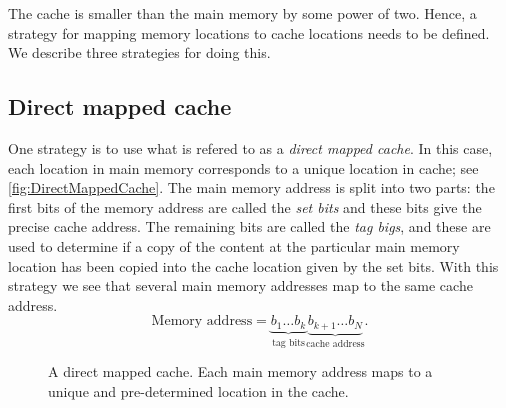 The cache is smaller than the main memory by some power of two. Hence, a
strategy for mapping memory locations to cache locations needs to be defined. We
describe three strategies for doing this.

\subsection{Direct mapped cache}

One strategy is to use what is refered to as a \emph{direct mapped cache}. In
this case, each location in main memory corresponds to a unique location in
cache; see \autoref{fig:DirectMappedCache}. The main memory address is split
into two parts: the first bits of the memory address are called the \emph{set
bits} and these bits give the precise cache address. The remaining bits are
called the \emph{tag bigs}, and these are used to determine if a copy of the
content at the particular main memory location has been copied into the cache
location given by the set bits. With this strategy we see that several main
memory addresses map to the same cache address.
\[
  \text{Memory address} =
  \underbrace{b_1 \ldots b_k}_{\text{tag bits}}
  \underbrace{b_{k+1} \ldots b_{N}}_{\text{cache address}}.
\]

\begin{figure}
  \centering
  \caption{
    A direct mapped cache. Each main memory address maps to a unique and
    pre-determined location in the cache.
  }
  \label{fig:DirectMappedCache}
\end{figure}

